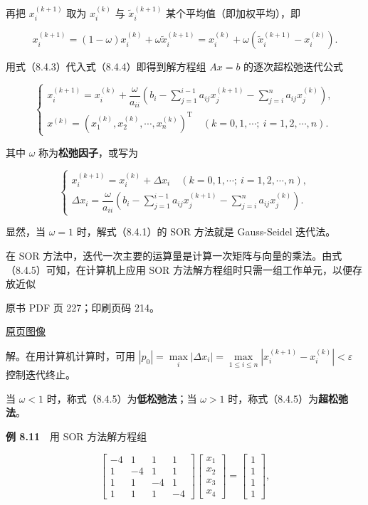 再把 \(x_i^{(k+1)}\) 取为 \(x_i^{(k)}\) 与 \(\tilde{x}_i^{(k+1)}\) 某个平均值（即加权平均），即

\[
x_i^{(k+1)}=(1-\omega)x_i^{(k)}+\omega\tilde{x}_i^{(k+1)}
=x_i^{(k)}+\omega(\tilde{x}_i^{(k+1)}-x_i^{(k)}).
\tag{8.4.4}
\]

用式（8.4.3）代入式（8.4.4）即得到解方程组 \(Ax=b\) 的逐次超松弛迭代公式

\[
\begin{cases}
x_i^{(k+1)}=x_i^{(k)}+\dfrac{\omega}{a_{ii}}\left(b_i-\displaystyle\sum_{j=1}^{i-1}a_{ij}x_j^{(k+1)}-\displaystyle\sum_{j=i}^n a_{ij}x_j^{(k)}\right),\\[5pt]
x^{(k)}=(x_1^{(k)},x_2^{(k)},\cdots,x_n^{(k)})^{\mathrm T}\quad(k=0,1,\cdots;\ i=1,2,\cdots,n).
\end{cases}
\tag{8.4.5}
\]

其中 \(\omega\) 称为\textbf{松弛因子}，或写为

\[
\begin{cases}
x_i^{(k+1)}=x_i^{(k)}+\Delta x_i\quad(k=0,1,\cdots;\ i=1,2,\cdots,n),\\[5pt]
\Delta x_i=\dfrac{\omega}{a_{ii}}\left(b_i-\displaystyle\sum_{j=1}^{i-1}a_{ij}x_j^{(k+1)}-\displaystyle\sum_{j=i}^n a_{ij}x_j^{(k)}\right).
\end{cases}
\tag{8.4.6}
\]

显然，当 \(\omega=1\) 时，解式（8.4.1）的 SOR 方法就是 Gauss-Seidel 迭代法。

在 SOR 方法中，迭代一次主要的运算量是计算一次矩阵与向量的乘法。由式（8.4.5）可知，在计算机上应用 SOR 方法解方程组时只需一组工作单元，以便存放近似

\clearpage

原书 PDF 页 227；印刷页码 214。

\href{source-images/pdf-227.jpeg}{原页图像}

解。在用计算机计算时，可用 \(|p_0|=\max\limits_i|\Delta x_i|=\max\limits_{1\leqslant i\leqslant n}|x_i^{(k+1)}-x_i^{(k)}|<\varepsilon\) 控制迭代终止。

当 \(\omega<1\) 时，称式（8.4.5）为\textbf{低松弛法}；当 \(\omega>1\) 时，称式（8.4.5）为\textbf{超松弛法}。

\textbf{例 8.11}　用 SOR 方法解方程组

\[
\begin{bmatrix}-4&1&1&1\\1&-4&1&1\\1&1&-4&1\\1&1&1&-4\end{bmatrix}
\begin{bmatrix}x_1\\x_2\\x_3\\x_4\end{bmatrix}
=\begin{bmatrix}1\\1\\1\\1\end{bmatrix},
\]

